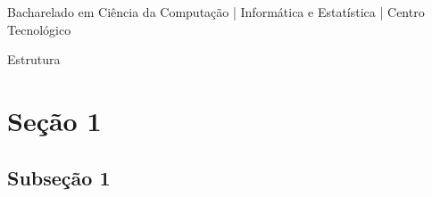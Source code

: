 

{
\begin{frame}[plain]
    \vspace{18mm}
    \begin{flushright}
    \textcolor{cinza}{\textbf{\large{\thetitle}}}
\end{flushright}

\vspace{-6mm}
\begin{flushright}
    \textcolor{cinza}{\textbf{\scriptsize{\theauthor}}}
\end{flushright}

\vspace{-7mm}
\begin{flushright}
    \textcolor{cinza}{\scriptsize{
        Bacharelado em Ciência da Computação | Informática e Estatística | Centro Tecnológico
    }}
\end{flushright}


\end{frame}
}

\begin{frame}{Estrutura}
    \tableofcontents
\end{frame}

\section{Seção 1}

\subsection{Subseção 1}

